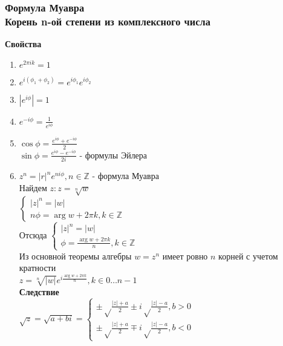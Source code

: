 \documentclass[12pt]{article}
\begin{document}
\subsubsection{Формула Муавра\\Корень n-ой степени из комплексного числа}
\textbf{Свойства}
\begin{enumerate}
    \item $e^{2\pi ik} = 1$
    \item $e^{i(\phi_1+\phi_2)} = e^{i\phi_1}e^{i\phi_2}$
    \item $|e^{i\phi}| = 1$
    \item $e^{-i\phi} = \frac1{e^{i\phi}}$
    \item $\cos \phi = \frac{e^{i\phi}+e^{-i\phi}}{2}$\\
     $\sin \phi = \frac{e^{i\phi}-e^{-i\phi}}{2i}$ - формулы Эйлера
    \item $z^n = |r|^ne^{ni\phi}, n \in \mathbb{Z}$ - формула Муавра\\
    Найдем $z:z=\sqrt[n]{w}$\\
    $\left\{\begin{array}{l}
        |z|^n=|w|\\
        n\phi = \arg w+2\pi k, k \in \mathbb{Z}
    \end{array}\right.$\\
    Отсюда $\left\{\begin{array}{l}
        |z|^n=|w|\\
        \phi = \frac{\arg w+2\pi k}n, k\in\mathbb{Z}
    \end{array}\right.$\\
    Из основной теоремы алгебры $w=z^n$ имеет ровно $n$ корней с учетом кратности\\
    $z=\sqrt[n]{|w|}e^{i\frac{\arg w+2\pi k}n}, k \in 0\ldots n-1$\\
    \textbf{Следствие}\\
    $\sqrt z = \sqrt{a+bi} = \left\{\begin{array}{l}
         \pm\sqrt\frac{|z|+a}2\pm i\sqrt\frac{|z|-a}2, b > 0\\
         \pm\sqrt\frac{|z|+a}2\mp i\sqrt\frac{|z|-a}2, b < 0
    \end{array}\right.$
\end{enumerate}
\end{document}
